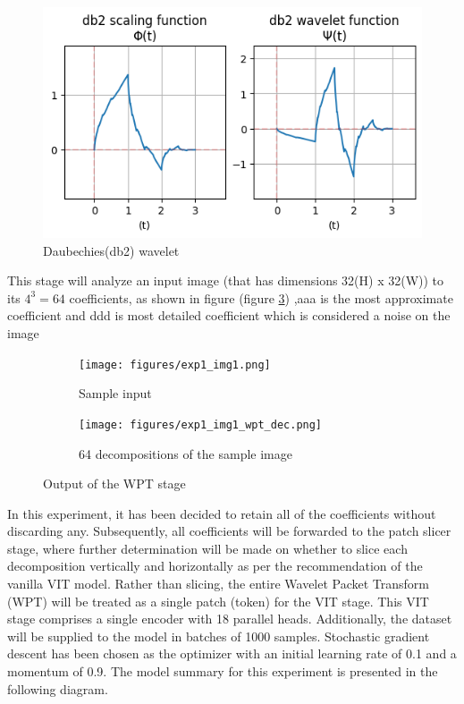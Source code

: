 \documentclass{svproc}
\begin{document}
\begin{figure}[H]
  \centering
    \includegraphics[width=0.5\linewidth]{figures/wavelet_db2.png}
    \caption{Daubechies(db2) wavelet}
    \label{fig:db2}
\end{figure}

\noindent
This stage will analyze an input image (that has dimensions 32(H) x 32(W)) to its $4^3 = 64$ coefficients, as shown in figure (figure \ref{fig:db2_dec_exp1}) ,aaa is the most approximate coefficient and ddd is most detailed coefficient which is considered a noise on the image 

\begin{figure}[H]
  \centering
  \begin{subfigure}{0.25\textwidth}
    \centering
    \texttt{[image: figures/exp1\_img1.png]}
    \caption{Sample input}
    \label{fig:exp1_sub1}
  \end{subfigure}%

  \bigskip
  
  \begin{subfigure}{0.7\textwidth}
    \centering
    \texttt{[image: figures/exp1\_img1\_wpt\_dec.png]}
    \caption{64 decompositions of the sample image}
  \end{subfigure}

  \caption{Output of the WPT stage}
  \label{fig:db2_dec_exp1}
\end{figure}

\noindent
In this experiment, it has been decided to retain all of the coefficients without discarding any. Subsequently, all coefficients will be forwarded to the patch slicer stage, where further determination will be made on whether to slice each decomposition vertically and horizontally as per the recommendation of the vanilla VIT model. Rather than slicing, the entire Wavelet Packet Transform (WPT) will be treated as a single patch (token) for the VIT stage. This VIT stage comprises a single encoder with 18 parallel heads. Additionally, the dataset will be supplied to the model in batches of 1000 samples. Stochastic gradient descent has been chosen as the optimizer with an initial learning rate of 0.1 and a momentum of 0.9. The model summary for this experiment is presented in the following diagram.
\end{document}
